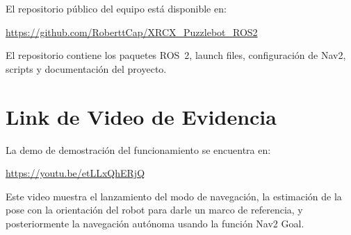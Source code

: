 \documentclass[conference]{IEEEtran}
\begin{document}
El repositorio público del equipo está disponible en:

\begin{center}
\url{https://github.com/RoberttCap/XRCX_Puzzlebot_ROS2}
\end{center}

El repositorio contiene los paquetes ROS~2, launch files, configuración de
Nav2, scripts y documentación del proyecto.

\section*{Link de Video de Evidencia}

La demo de demostración del funcionamiento se encuentra en:

\begin{center}
\url{https://youtu.be/etLLxQhERjQ}
\end{center}

Este video muestra el lanzamiento del modo de navegación, la estimación de la
pose con la orientación del robot para darle un marco de referencia, y
posteriormente la navegación autónoma usando la función Nav2 Goal.
\end{document}

